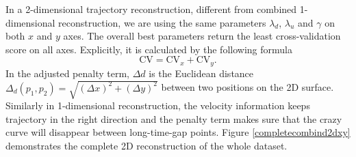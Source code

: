 In a 2-dimensional trajectory reconstruction, different from combined 1-dimensional reconstruction, we are using the same parameters $\lambda_d$, $\lambda_u$ and $\gamma$ on both $x$ and $y$ axes. The overall best parameters return the least cross-validation score on all axes. Explicitly, it is calculated by the following formula 
\begin{equation}
\mbox{CV}=\mbox{CV}_x+\mbox{CV}_y.
\end{equation}
In the adjusted penalty term, $\Delta d$ is the Euclidean distance $\Delta_d(p_1,p_2)=\sqrt{(\Delta x)^2+(\Delta y)^2}$ between two positions on the 2D surface. Similarly in 1-dimensional reconstruction, the velocity information keeps trajectory in the right direction and the penalty term makes sure that the crazy curve will disappear between long-time-gap points. Figure \ref{completecombind2dxy} demonstrates the complete 2D reconstruction of the whole dataset.  
